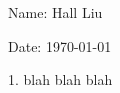 \documentclass{article}
\begin{document}
Name: Hall Liu

Date: \today 
\vspace{1.5cm}

1. blah blah blah
\end{document}
